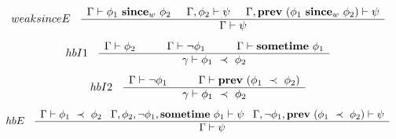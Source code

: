 \[
\begin{array}{cc}
{\sc weaksinceE}
&
\begin{array}{c}
\Gamma\vdash \phi_1\ \Since_w\ \phi_2 \hspace*{0,5cm} \Gamma,\phi_2 \vdash \psi \hspace*{0,5cm} \Gamma,\Prev\ (\phi_1\ \Since_w\ \phi_2) \vdash \psi \\ \hline
\Gamma \vdash \psi
\end{array}
\end{array}
\]
\[
\begin{array}{cc}
{\sc hbI1}
&
\begin{array}{c}
\Gamma \vdash \phi_2 \hspace*{1cm}
\Gamma \vdash \neg\phi_1 \hspace*{1cm}
\Gamma \vdash \mathbf{sometime}\ \phi_1 \\ \hline
\gamma \vdash \phi_1\ \prec\ \phi_2
\end{array}
\end{array}
\]
\[
\begin{array}{cc}
{\sc hbI2}
&
\begin{array}{c}
\Gamma \vdash \neg\phi_1 \hspace*{1cm}
\Gamma \vdash \mathbf{prev}\ (\phi_1\ \prec\ \phi_2) \\ \hline
\gamma \vdash \phi_1\ \prec\ \phi_2
\end{array}
\end{array}
\]
\[
\begin{array}{cc}
{\sc hbE}
&
\begin{array}{c}
\Gamma \vdash \phi_1\ \HappensBefore\ \phi_2 \hspace*{0,3cm}
\Gamma,\phi_2,\neg\phi_1,\Sometime\ \phi_1 \vdash \psi \hspace*{0,3cm}
\Gamma,\neg\phi_1,\Prev\ (\phi_1\ \HappensBefore\ \phi_2) \vdash \psi
\\ \hline
\Gamma \vdash \psi
\end{array}
\end{array}
\]
%
